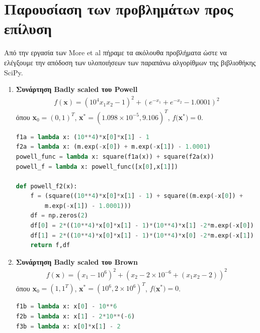 \documentclass[a4paper,12pt,twoside]{report}
\theoremstyle{plain}
\theoremstyle{definition}
\theoremstyle{remark}
\begin{document}
\section{Παρουσίαση των προβλημάτων προς επίλυση}
Από την εργασία των More et al \cite{More1981} πήραμε τα ακόλουθα προβλήματα ώστε να ελέγξουμε την απόδοση των υλοποιήσεων των παραπάνω αλγορίθμων της βιβλιοθήκης SciPy.
\begin{enumerate}
\item \textbf{Συνάρτηση Badly scaled του Powell}
\begin{align}
f(\textbf{x}) = (10^4x_1x_2-1)^2 + (e^{-x_1}+e^{-x_2} - 1.0001)^2
\end{align}
όπου  \textbf{x}$_0 = (0,1)^T$,\hspace{0.1cm} \textbf{x}$^*=(1.098\times10^{-5}, 9.106)^T$, \hspace{0.1cm} $f($\textbf{x}$^*)=0$.

\begin{lstlisting}[extendedchars=true,caption="Η συνάρτηση Powell σε κώδικα Python",language=python]
f1a = lambda x: (10**4)*x[0]*x[1] - 1
f2a = lambda x: (m.exp(-x[0]) + m.exp(-x[1]) - 1.0001)
powell_func = lambda x: square(f1a(x)) + square(f2a(x))
powell_f = lambda x: powell_func([x[0],x[1]])

def powell_f2(x):
    f = (square((10**4)*x[0]*x[1] - 1) + square((m.exp(-x[0]) + 
    	m.exp(-x[1]) - 1.0001)))
    df = np.zeros(2)
    df[0] = 2*((10**4)*x[0]*x[1] - 1)*(10**4)*x[1] -2*m.exp(-x[0])
    df[1] = 2*((10**4)*x[0]*x[1] - 1)*(10**4)*x[0] -2*m.exp(-x[1])
    return f,df
\end{lstlisting}

\item \textbf{Συνάρτηση Badly scaled του Brown }
\begin{align}
f(\textbf{x}) = (x_1-10^6)^2+(x_2-2\times 10^{-6}+(x_1x_2-2))^2
\end{align}
όπου  \textbf{x}$_0 = (1,1^T)$,\hspace{0.1cm} \textbf{x}$^*=(10^6, 2\times 10^6)^T$, \hspace{0.1cm} $f($\textbf{x}$^*)=0$.

\begin{lstlisting}[extendedchars=true,caption="Η συνάρτηση Brown σε κώδικα Python",language=python]
f1b = lambda x: x[0] - 10**6
f2b = lambda x: x[1] - 2*10**(-6)
f3b = lambda x: x[0]*x[1] - 2


\end{lstlisting}
\end{enumerate}
\end{document}
